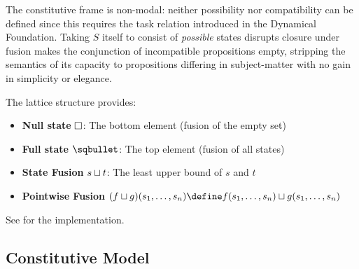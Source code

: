 \documentclass[../LogosReference.tex]{subfiles}
\begin{document}
\begin{remark}
	The constitutive frame is non-modal: neither possibility nor compatibility can be defined since this requires the task relation introduced in the Dynamical Foundation.
	Taking $S$ itself to consist of \textit{possible} states disrupts closure under fusion makes the conjunction of incompatible propositions empty, stripping the semantics of its capacity to propositions differing in subject-matter with no gain in simplicity or elegance.
\end{remark}

\begin{remark}
	The lattice structure provides:
	\begin{itemize}
		\item \textbf{Null state} $\square$: The bottom element (fusion of the empty set)
		\item \textbf{Full state} $\fullstate$: The top element (fusion of all states)
		\item \textbf{State Fusion} $s\sqcup t$: The least upper bound of $s$ and $t$
		\item \textbf{Pointwise Fusion} $(\fusion{f}{g})(s_1,\ldots,s_n) \define \fusion{f(s_1,\ldots,s_n)}{g(s_1,\ldots,s_n)}$ 
	\end{itemize}
	See  for the implementation.
\end{remark}



\subsection{Constitutive Model}\label{sec:constitutive-model}

\end{document}
